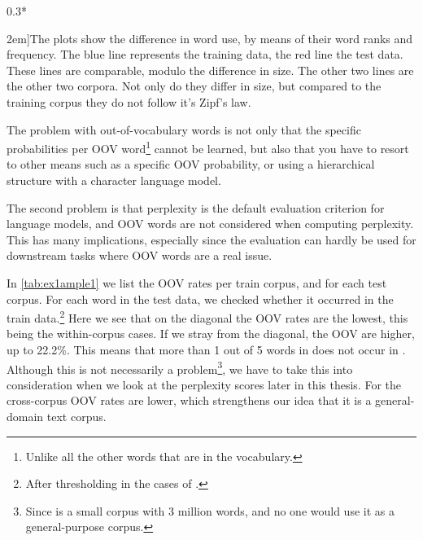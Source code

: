 \begin{figure*}
{\begin{scaletikzpicturetowidth}{0.3*\textwidth}
\begin{tikzpicture}
			\end{tikzpicture}
	\end{scaletikzpicturetowidth}}%
	
	\caption[][2em]{The plots show the difference in word use, by means of their word ranks and frequency. The blue line represents the training data, the red line the test data. These lines are comparable, modulo the difference in size. The other two lines are the other two corpora. Not only do they differ in size, but compared to the training corpus they do not follow it's Zipf's law.}
\end{figure*}

The problem with out-of-vocabulary words is not only that the specific probabilities per OOV word\footnote{Unlike all the other words that are in the vocabulary.} cannot be learned, but also that you have to resort to other means such as a specific OOV probability, or using a hierarchical structure with a character language model.

The second problem is that perplexity is the default evaluation criterion for language models, and OOV words are not considered when computing perplexity. This has many implications, especially since the evaluation can hardly be used for downstream tasks where OOV words are a real issue.

In \cref{tab:ex1ample1} we list the OOV rates per train corpus, and for each test corpus. For each word in the test data, we checked whether it occurred in the train data.\footnote{After thresholding in the cases of \obw.}
Here we see that on the diagonal the OOV rates are the lowest, this being the within-corpus cases. If we stray from the diagonal, the OOV are higher, up to 22.2\%. This means that more than 1 out of 5 words in \wp does not occur in \emea. Although this is not necessarily a problem\footnote{Since \emea is a small corpus with 3 million words, and no one would use it as a general-purpose corpus.}, we have to take this into consideration when we look at the perplexity scores later in this thesis.
For \obw the cross-corpus OOV rates are lower, which strengthens our idea that it is a general-domain text corpus.

